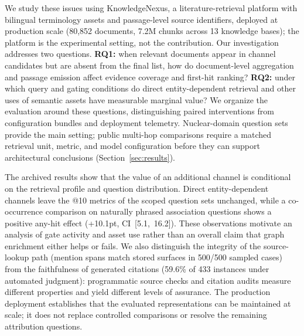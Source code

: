 \documentclass[sigconf,nonacm]{acmart}
\begin{document}
We study these issues using KnowledgeNexus, a literature-retrieval
platform with bilingual terminology assets and passage-level source
identifiers, deployed at production scale (80{,}852 documents, 7.2M
chunks across 13 knowledge bases); the platform is the experimental
setting, not the contribution. Our investigation addresses two
questions. \textbf{RQ1:} when relevant documents appear in channel
candidates but are absent from the final list, how do document-level
aggregation and passage emission affect evidence coverage and
first-hit ranking? \textbf{RQ2:} under which query and gating
conditions do direct entity-dependent retrieval and other uses of
semantic assets have measurable marginal value? We organize the
evaluation around these questions, distinguishing paired interventions
from configuration bundles and deployment telemetry. Nuclear-domain
question sets provide the main setting; public multi-hop comparisons
require a matched retrieval unit, metric, and model configuration
before they can support architectural conclusions
(Section~\ref{sec:results}).

The archived results show that the value of an additional channel is
conditional on the retrieval profile and question distribution. Direct
entity-dependent channels leave the @10 metrics of the scoped question
sets unchanged, while a co-occurrence comparison on naturally phrased
association questions shows a positive any-hit effect (+10.1pt,
CI~[5.1,~16.2]). These observations motivate an analysis of gate
activity and asset use rather than an overall claim that graph
enrichment either helps or fails. We also distinguish the integrity of
the source-lookup path (mention spans match stored surfaces in 500/500
sampled cases) from the faithfulness of generated citations (59.6\% of
433 instances under automated judgment): programmatic source checks and
citation audits measure different properties and yield different levels
of assurance. The production deployment establishes that the evaluated
representations can be maintained at scale; it does not replace
controlled comparisons or resolve the remaining attribution questions.
\end{document}
